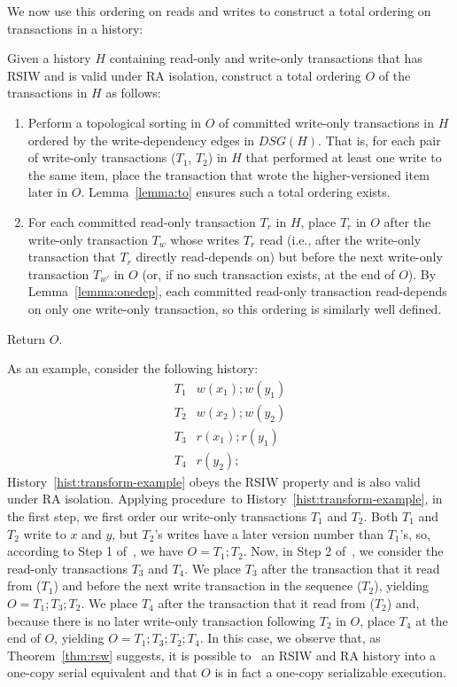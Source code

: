 We now use this ordering on reads and writes to construct a total
ordering on transactions in a history:

\begin{procedure}[Transform]
  Given a history $H$ containing read-only and write-only transactions
  that has RSIW and is valid under RA isolation,
  construct a total ordering $O$ of the transactions in $H$ as
  follows:
\begin{enumerate}
\item Perform a topological sorting in $O$ of committed write-only
  transactions in $H$ ordered by the write-dependency edges in
  $DSG(H)$. That is, for each pair of write-only transactions ($T_1$,
  $T_2$) in $H$ that performed at least one write to the same item,
  place the transaction that wrote the higher-versioned item later in
  $O$. Lemma~\ref{lemma:to} ensures such a total ordering exists.
\item For each committed read-only transaction $T_r$ in $H$, place
  $T_r$ in $O$ after the write-only transaction $T_w$ whose writes
  $T_r$ read (i.e., after the write-only transaction that $T_r$
  directly read-depends on) but before the next write-only transaction
  $T_{w'}$ in $O$ (or, if no such transaction exists, at the end of
  $O$). By Lemma~\ref{lemma:onedep}, each committed read-only
  transaction read-depends on only one write-only transaction, so this
  ordering is similarly well defined.
\end{enumerate}

Return $O$.

\end{procedure}

As an example, consider the following history:
\begin{eqnarray}
\label{hist:transform-example}
T_1 & w(x_1); w(y_1)\\
T_2 & w(x_2); w(y_2)\nonumber\\
T_3 & r(x_1); r(y_1)\nonumber\\
T_4 & r(y_2);\nonumber
\end{eqnarray}
History~\ref{hist:transform-example} obeys the RSIW property and is
also valid under RA isolation. Applying procedure~\transform to
History~\ref{hist:transform-example}, in the first step, we first
order our write-only transactions $T_1$ and $T_2$. Both $T_1$ and
$T_2$ write to $x$ and $y$, but $T_2$'s writes have a later version
number than $T_1$'s, so, according to Step 1 of~\transform, we have
$O=T_1; T_2$. Now, in Step 2 of~\transform, we consider the read-only
transactions $T_3$ and $T_4$. We place $T_3$ after the transaction
that it read from ($T_1$) and before the next write transaction in the
sequence ($T_2$), yielding $O=T_1; T_3; T_2$. We place $T_4$ after the
transaction that it read from ($T_2$) and, because there is no later
write-only transaction following $T_2$ in $O$, place $T_4$ at the end
of $O$, yielding $O=T_1; T_3; T_2; T_4$. In this case, we observe
that, as Theorem~\ref{thm:rsw} suggests, it is possible to~\transform
an RSIW and RA history into a one-copy serial equivalent and that $O$ is in fact
a one-copy serializable execution.

